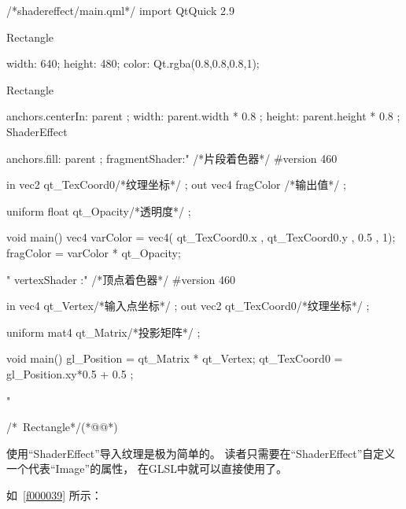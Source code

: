 \label{f000038}    %
\FloatBarrier                                  %
\begin{thebookfilesourceone}[escapeinside={(*@}{@*)},
caption=GoodLuck,
title=\filesourcenumbernameone \thefilesourcenumber
]
/*shadereffect/main.qml*/
import QtQuick 2.9

Rectangle {

    width: 640;
    height: 480;
    color: Qt.rgba(0.8,0.8,0.8,1);

    Rectangle{
        anchors.centerIn: parent    ;
        width: parent.width * 0.8   ;
        height: parent.height * 0.8 ;
        ShaderEffect{
            anchors.fill: parent ;
            fragmentShader:"
/*片段着色器*/
#version 460

in vec2  qt_TexCoord0/*纹理坐标*/  ;
out vec4 fragColor   /*输出值*/    ;

uniform float qt_Opacity/*透明度*/ ;

void main() {
    vec4 varColor  = vec4( qt_TexCoord0.x ,  qt_TexCoord0.y , 0.5 , 1);
    fragColor = varColor * qt_Opacity;
}

"
            vertexShader :"
/*顶点着色器*/
#version 460

in vec4 qt_Vertex/*输入点坐标*/    ;
out vec2 qt_TexCoord0/*纹理坐标*/  ;

uniform mat4 qt_Matrix/*投影矩阵*/ ;

void main() {
    gl_Position = qt_Matrix * qt_Vertex;
    qt_TexCoord0 = gl_Position.xy*0.5 + 0.5 ;
}

"
        }
    }

}/*~Rectangle*/(*@\marginpar[\hfill\setlength\fboxsep{2pt}\fbox{\footnotesize{\kaishu\parbox{1em}{\setlength{\baselineskip}{2pt}\filesourcenumbernameone}}\footnotesize{\thefilesourcenumber}}]{\setlength\fboxsep{2pt}\fbox{\footnotesize{\kaishu\parbox{1em}{\setlength{\baselineskip}{2pt}\filesourcenumbernameone}}\footnotesize{\thefilesourcenumber}}}@*)\end{thebookfilesourceone}          %
\addtocounter{lstlisting}{-1}   %


使用“ShaderEffect”导入纹理是极为简单的。
读者只需要在“ShaderEffect”自定义
一个代表“Image”的属性，
在GLSL中就可以直接使用了。

如\filesourcenumbernameone\ \ref{f000039}
所示：

